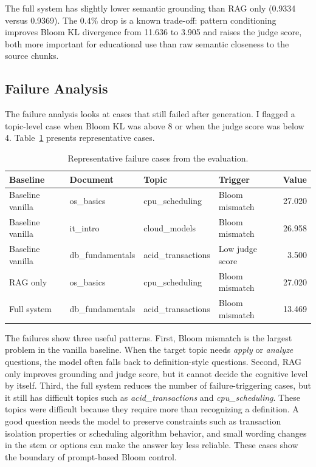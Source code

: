 \documentclass[12pt,a4paper]{article}
\begin{document}
The full system has slightly lower semantic grounding than RAG only
(0.9334 versus 0.9369). The 0.4\% drop is a known trade-off: pattern
conditioning improves Bloom KL divergence from 11.636 to 3.905 and raises
the judge score, both more important for educational use than raw semantic
closeness to the source chunks.


\subsection{Failure Analysis}

The failure analysis looks at cases that still failed after generation. I
flagged a topic-level case when Bloom KL was above 8 or when the judge score
was below 4. Table~\ref{tab:failures} presents representative cases.

\begin{table}[H]
  \centering
  \singlespacing
  \caption{Representative failure cases from the evaluation.}
  \label{tab:failures}
  \small
  \begin{tabular}{@{}p{2.8cm}p{2.6cm}p{2.8cm}p{3.2cm}r@{}}
    \toprule
    \textbf{Baseline} & \textbf{Document} & \textbf{Topic} &
    \textbf{Trigger} & \textbf{Value} \\
    \midrule
    Baseline vanilla & os\_basics         & cpu\_scheduling   & Bloom mismatch   & 27.020 \\
    Baseline vanilla & it\_intro          & cloud\_models     & Bloom mismatch   & 26.958 \\
    Baseline vanilla & db\_fundamentals   & acid\_transactions & Low judge score  & 3.500  \\
    RAG only         & os\_basics         & cpu\_scheduling   & Bloom mismatch   & 27.020 \\
    Full system      & db\_fundamentals   & acid\_transactions & Bloom mismatch   & 13.469 \\
    \bottomrule
  \end{tabular}
\end{table}

The failures show three useful patterns. First, Bloom mismatch is the
largest problem in the vanilla baseline. When the target topic needs
\textit{apply} or \textit{analyze} questions, the model often falls back to
definition-style questions. Second, RAG only improves grounding and judge
score, but it cannot decide the cognitive level by itself. Third, the full
system reduces the number of failure-triggering cases, but it still has
difficult topics such as \textit{acid\_transactions} and
\textit{cpu\_scheduling}. These topics were difficult because they require
more than recognizing a definition. A good question needs the model to
preserve constraints such as transaction isolation properties or scheduling
algorithm behavior, and small wording changes in the stem or options can
make the answer key less reliable. These cases show the boundary of
prompt-based Bloom control.
\end{document}
